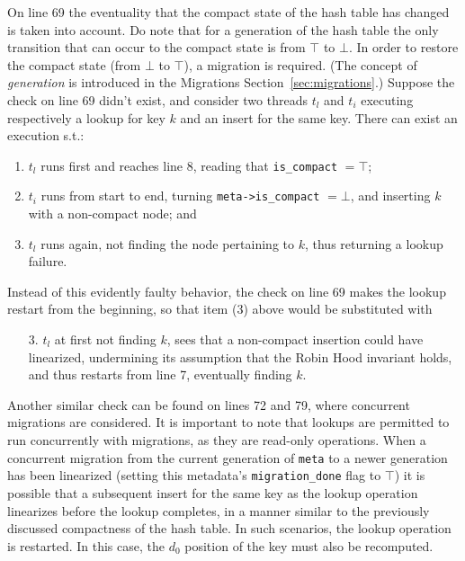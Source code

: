 On line 69 the eventuality that the compact state of the hash table has changed is taken into account.
Do note that for a generation of the hash table the only transition that can occur to the compact state is from $\top$ to $\bot$.
In order to restore the compact state (from $\bot$ to $\top$), a migration is required.
(The concept of \emph{generation} is introduced in the Migrations Section~\ref{sec:migrations}.)
Suppose the check on line 69 didn't exist, and consider two threads $t_l$ and $t_i$ executing respectively a lookup for key $k$ and an insert for the same key.
There can exist an execution s.t.:
\begin{enumerate}
    \item $t_l$ runs first and reaches line 8, reading that \texttt{is\_compact} $= \top$;
    \item $t_i$ runs from start to end, turning \texttt{{meta->is\_compact}} $= \bot$, and inserting $k$ with a non-compact node; and
    \item $t_l$ runs again, not finding the node pertaining to $k$, thus returning a lookup failure.
\end{enumerate}
Instead of this evidently faulty behavior, the check on line 69 makes the lookup restart from the beginning, so that item (3) above would be substituted with
\begin{enumerate}
    \item[3.] $t_l$ at first not finding $k$, sees that a non-compact insertion could have linearized, undermining its assumption that the Robin Hood invariant holds, and thus restarts from line 7, eventually finding $k$.
\end{enumerate}

Another similar check can be found on lines 72 and 79, where concurrent migrations are considered.
It is important to note that lookups are permitted to run concurrently with migrations, as they are read-only operations.
When a concurrent migration from the current generation of \texttt{meta} to a newer generation has been linearized (setting this metadata's \texttt{{migration\_done}} flag to $\top$) it is possible that a subsequent insert for the same key as the lookup operation linearizes before the lookup completes, in a manner similar to the previously discussed compactness of the hash table.
In such scenarios, the lookup operation is restarted.
In this case, the $d_0$ position of the key must also be recomputed.

